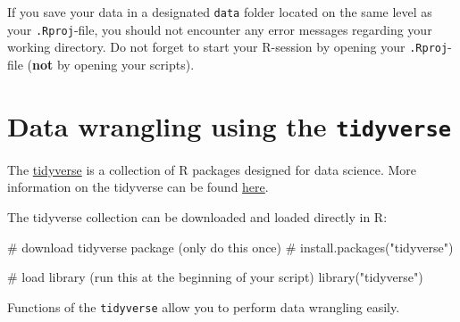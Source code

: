 \documentclass[
  letterpaper,
  DIV=11,
  numbers=noendperiod,
  oneside]{scrreprt}
\newenvironment{Shaded}{\begin{snugshade}}{\end{snugshade}}
\newcommand{\CommentTok}[1]{\textcolor[rgb]{0.37,0.37,0.37}{#1}}
\newcommand{\FunctionTok}[1]{\textcolor[rgb]{0.28,0.35,0.67}{#1}}
\newcommand{\NormalTok}[1]{\textcolor[rgb]{0.00,0.23,0.31}{#1}}
\newcommand{\StringTok}[1]{\textcolor[rgb]{0.13,0.47,0.30}{#1}}
\begin{document}
\begin{tcolorbox}[enhanced jigsaw, leftrule=.75mm, colframe=quarto-callout-important-color-frame, left=2mm, breakable, bottomrule=.15mm, rightrule=.15mm, colback=white, opacityback=0, arc=.35mm, toprule=.15mm]
\begin{minipage}[t]{5.5mm}
\textcolor{quarto-callout-important-color}{\faExclamation}
\end{minipage}%
\begin{minipage}[t]{\textwidth - 5.5mm}

If you save your data in a designated \texttt{data} folder located on
the same level as your \texttt{.Rproj}-file, you should not encounter
any error messages regarding your working directory. Do not forget to
start your R-session by opening your \texttt{.Rproj}-file (\textbf{not}
by opening your scripts).

\end{minipage}%
\end{tcolorbox}


\hypertarget{data-wrangling-using-the-tidyverse}{%
\chapter{\texorpdfstring{Data wrangling using the
\texttt{tidyverse}}{Data wrangling using the tidyverse}}\label{data-wrangling-using-the-tidyverse}}

\hfill\break

The \href{https://www.tidyverse.org/}{tidyverse} is a collection of R
packages designed for data science. More information on the tidyverse
can be found \href{https://r4ds.had.co.nz/}{here}.

The tidyverse collection can be downloaded and loaded directly in R:

\begin{Shaded}
\begin{Highlighting}[]
\CommentTok{\# download tidyverse package (only do this once)}
\CommentTok{\# install.packages("tidyverse") }

\CommentTok{\# load library (run this at the beginning of your script)}
\FunctionTok{library}\NormalTok{(}\StringTok{"tidyverse"}\NormalTok{) }
\end{Highlighting}
\end{Shaded}

Functions of the \texttt{tidyverse} allow you to perform data wrangling
easily.
\end{document}
